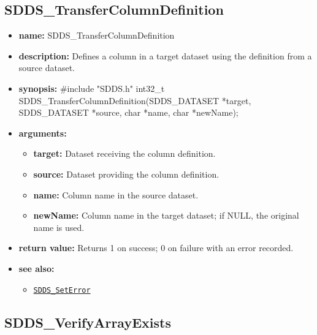 \documentclass[11pt]{article}
\newcommand{\progref}[1]{\hyperref[SDDS_#1]{\tt SDDS\_#1}}
\begin{document}
\subsection{SDDS\_TransferColumnDefinition}
\label{SDDS_TransferColumnDefinition}

\begin{itemize}
\item {\bf name:}\newline
SDDS\_TransferColumnDefinition
\item {\bf description:}\newline
Defines a column in a target dataset using the definition from a source dataset.
\item {\bf synopsis:} \#include "SDDS.h"\newline
int32\_t SDDS\_TransferColumnDefinition(SDDS\_DATASET *target, SDDS\_DATASET *source, char *name, char *newName);
\item {\bf arguments:}
\begin{itemize}
\item {\bf target:} Dataset receiving the column definition.
\item {\bf source:} Dataset providing the column definition.
\item {\bf name:} Column name in the source dataset.
\item {\bf newName:} Column name in the target dataset; if NULL, the original name is used.
\end{itemize}
\item {\bf return value:}\newline
Returns 1 on success; 0 on failure with an error recorded.
\item {\bf see also:}
\begin{itemize}
\item \progref{SetError}
\end{itemize}
\end{itemize}

\subsection{SDDS\_VerifyArrayExists}
\label{SDDS_VerifyArrayExists}
\end{document}

